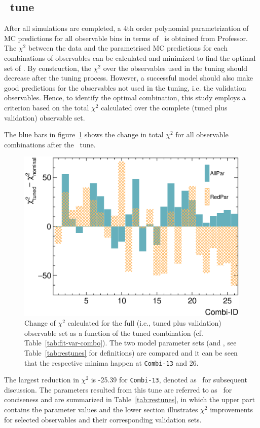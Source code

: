    \subsection{\allpar\ tune}
    After all simulations are completed, a 4th order polynomial parametrization of MC predictions for all observable bins in terms of \allpar\ is obtained from Professor.
    The $\chi^2$ between the data and the parametrised MC predictions for each combinations of observables can be calculated and minimized to find the optimal set of \allpar.
    By construction, the $\chi^2$ over the observables used in the tuning should decrease after the tuning process.
    However, a successful model should also make good predictions for the observables not used in the tuning, i.e. the validation observables.
    Hence, to identify the optimal combination, this study employs a criterion based on the total $\chi^2$ calculated over the complete (tuned plus validation) observable set.

    The blue bars in figure~\ref{fig:allchi} shows the change in total $\chi^2$ for all observable combinations after the \allbar\ tune.
    \begin{figure}[!htb] 
        \centering 		
        \includegraphics[width=\sgfigwid\textwidth]{figures/tuning/chi2_hist_covfix.eps} 
        \caption{\label{fig:allchi} Change of $\chi^2$ calculated for the full (i.e., tuned plus validation) observable set as a function of the tuned combination (cf. Table~\ref{tab:fit-var-combo}). The two model parameter sets (\allpar and \redpar, see Table~\ref{tab:restunes} for definitions) are compared and it can be seen that the respective minima happen at \texttt{Combi-13} and 26. }   
    \end{figure}
    The largest reduction in $\chi^2$ is -25.39 for \texttt{Combi-13}, denoted as \cbAllPar\ for subsequent discussion.
    The parameters resulted from this tune are referred to as \gT\ for conciseness and are summarized in Table~\ref{tab:restunes}, in which the upper part contains the parameter values and the lower section illustrates $\chi^2$ improvements for selected observables and their corresponding validation sets. 

